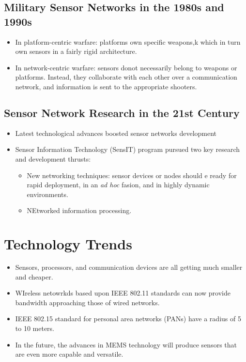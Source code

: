 \documentclass[letterpaper,10pt]{article}
\begin{document}
\subsection{Military Sensor Networks in the 1980s and 1990s}

\begin{itemize}
	\item In platform-centric warfare: platforms own specific weapons,k which in turn own sensors in a fairly rigid architecture.
	\item In network-centric warfare: sensors donot necessarily belong to weapons or platforms. Instead, they collaborate with each other over a communication network, and information is sent to the appropriate shooters.
\end{itemize}

\subsection{Sensor Network Research in the 21st Century}

\begin{itemize}
	\item Latest technological advances boosted sensor networks development
	\item Sensor Information Technology (SensIT) program pursued two key research and development thrusts:
	\begin{itemize}
		\item New networking techniques: sensor devices or nodes should e ready for rapid deployment, in an \textit{ad hoc} fasion, and in highly dynamic environments.
		\item NEtworked information processing.
	\end{itemize}
\end{itemize}

\section{Technology Trends}

\begin{itemize}
	\item Sensors, processors, and communication devices are all getting much smaller and cheaper.
	\item WIreless netowrkds based upon IEEE 802.11 standards can now provide bandwidth approaching those of wired networks.
	\item IEEE 802.15 standard for personal area networks (PANs) have a radius of 5 to 10 meters.
	\item In the future, the advances in MEMS technology will produce sensors that are even more capable and versatile.
\end{itemize}
\end{document}
